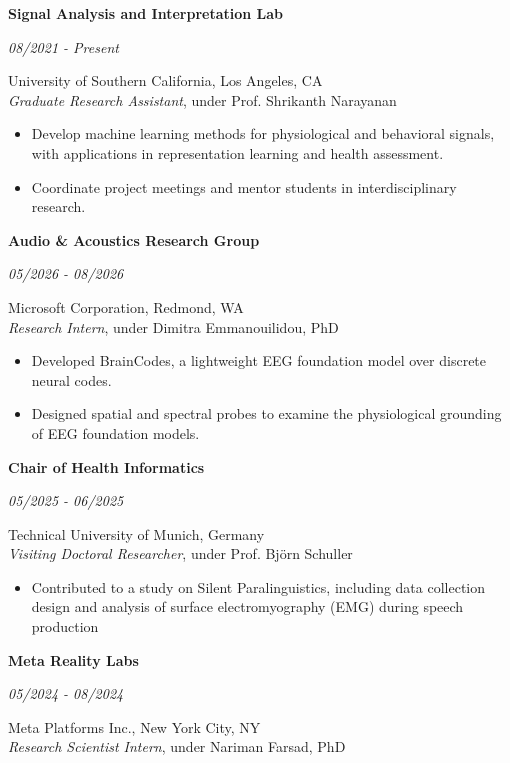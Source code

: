 \documentclass[margin]{res}
\newcommand{\cvheading}[2]{%
  \par\Needspace{4\baselineskip}\noindent
  \parbox[t]{\dimexpr\linewidth-110pt\relax}{\raggedright\bfseries #1}%
  \hfill\parbox[t]{98pt}{\raggedleft\itshape #2}%
  \par\nopagebreak[4]\vspace{-\parskip}\noindent\ignorespaces}
\begin{document}
\begin{resume}
\cvheading{Signal Analysis and Interpretation Lab}{08/2021 - Present}
University of Southern California, Los Angeles, CA \\
\textit{Graduate Research Assistant}, under Prof. Shrikanth Narayanan
\vspace{1mm}
\begin{itemize}
    \item Develop machine learning methods for physiological and behavioral signals, with applications in representation learning and health assessment.
    \item Coordinate project meetings and mentor students in interdisciplinary research.
\end{itemize}
\par
\cvheading{Audio \& Acoustics Research Group}{05/2026 - 08/2026}
Microsoft Corporation, Redmond, WA \\
\textit{Research Intern}, under Dimitra Emmanouilidou, PhD
\vspace{1mm}
\begin{itemize}
    \item Developed BrainCodes, a lightweight EEG foundation model over discrete neural codes.
    \item Designed spatial and spectral probes to examine the physiological grounding of EEG foundation models.
\end{itemize}
\par
\cvheading{Chair of Health Informatics}{05/2025 - 06/2025}
Technical University of Munich, Germany \\
\textit{Visiting Doctoral Researcher}, under Prof. Björn Schuller
\vspace{1mm}
\begin{itemize}
    \item Contributed to a study on Silent Paralinguistics, including data collection design and analysis of surface electromyography (EMG) during speech production
\end{itemize}
\par
\begin{minipage}[t]{\linewidth}
\cvheading{Meta Reality Labs}{05/2024 - 08/2024}
Meta Platforms Inc., New York City, NY \\
\textit{Research Scientist Intern}, under Nariman Farsad, PhD
\vspace{1mm}
\begin{itemize}

\end{itemize}
\end{minipage}
\end{resume}
\end{document}
